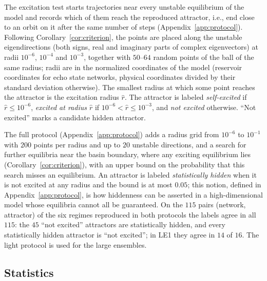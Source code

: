 The excitation test starts trajectories near every unstable equilibrium of the model and records which of them reach the
reproduced attractor, i.e., end close to an orbit on it after the same number of steps (Appendix~\ref{app:protocol}). Following
Corollary~\ref{cor:criterion}, the points are placed along the unstable eigendirections (both signs, real and imaginary parts
of complex eigenvectors) at radii $10^{-6}$, $10^{-4}$ and $10^{-3}$, together with $50$--$64$ random points of the ball of the
same radius; radii are in the normalized coordinates of the model (reservoir coordinates for echo state networks, physical
coordinates divided by their standard deviation otherwise). The smallest radius at which some point reaches the attractor is
the excitation radius $\hat r$. The attractor is labeled \emph{self-excited} if $\hat r\le10^{-6}$, \emph{excited at
radius $\hat r$} if $10^{-6}<\hat r\le10^{-3}$, and \emph{not excited} otherwise. ``Not excited'' marks a candidate hidden
attractor.

The full protocol (Appendix~\ref{app:protocol}) adds a radius grid from $10^{-6}$ to $10^{-1}$ with $200$ points per radius
and up to $20$ unstable directions, and a search for further equilibria near the basin boundary, where any exciting
equilibrium lies (Corollary~\ref{cor:criterion}), with an upper bound on the probability that this search misses an
equilibrium.\cite{Good1953,McAllesterOrtiz2003,BerendKontorovich2013,BenHamou2017MissingMass} An attractor is labeled
\emph{statistically hidden} when it is not excited at any radius and the bound is at most $0.05$; this notion, defined in
Appendix~\ref{app:protocol}, is how hiddenness can be asserted in a high-dimensional model whose equilibria cannot all be
guaranteed. On the $115$ pairs (network, attractor) of the six regimes reproduced in both protocols the labels agree in all
$115$: the $45$ ``not excited'' attractors are statistically hidden, and every statistically hidden attractor is ``not
excited''; in LE1 they agree in $14$ of $16$. The
light protocol is used for the large ensembles.

\subsection{Statistics}
\label{sec:stats}

